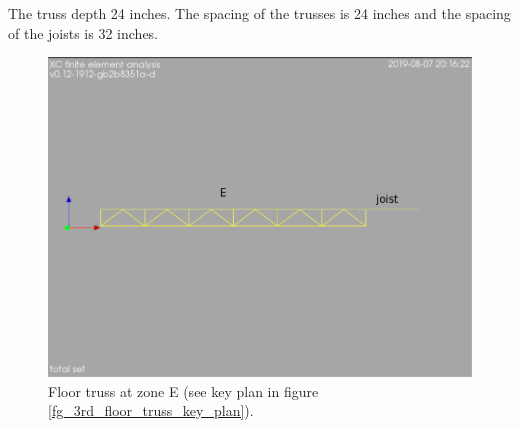 \noindent The truss depth 24 inches. The spacing of the trusses is 24 inches and the spacing of the joists is 32 inches.

\begin{figure}
  \begin{center}
  \includegraphics[width=120mm]{figures/floor_truss_E}
  \end{center}
  \caption{Floor truss at zone E (see key plan in figure \ref{fg_3rd_floor_truss_key_plan}).}\label{fg_floor_truss_E}
\end{figure}
